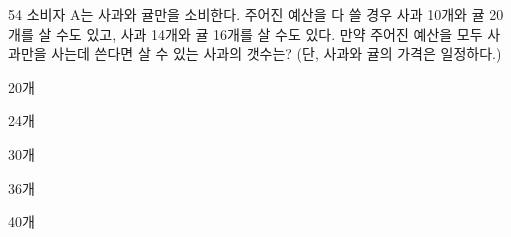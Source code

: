 \begin{question}{54}
소비자 A는 사과와 귤만을 소비한다. 주어진 예산을 다 쓸 경우 사과 10개와 귤 20개를 살 수도 있고, 사과 14개와 귤 16개를 살 수도 있다. 만약 주어진 예산을 모두 사과만을 사는데 쓴다면 살 수 있는 사과의 갯수는? (단, 사과와 귤의 가격은 일정하다.)
\begin{choices}
  \item 20개
  \item 24개
  \item 30개
  \item 36개
  \item 40개
\end{choices}
\end{question}
